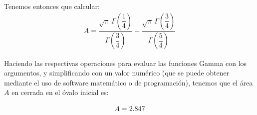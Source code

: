 Tenemos entonces que calcular:
\begin{align*}
A = \dfrac{\sqrt{\pi} \, \Gamma \left( \dfrac{1}{4} \right)}{\Gamma \left( \dfrac{3}{4} \right)} - \dfrac{\sqrt{\pi} \, \Gamma \left( \dfrac{3}{4} \right)}{\Gamma \left( \dfrac{5}{4} \right)}
\end{align*}

Haciendo las respectivas operaciones para evaluar las funciones Gamma con los argumentos, y simplificando con un valor numérico (que se puede obtener mediante el uso de software matemático o de programación), tenemos que el área $A$ en cerrada en el óvalo inicial es:

\begin{align*}
A = 2.847
\end{align*}
